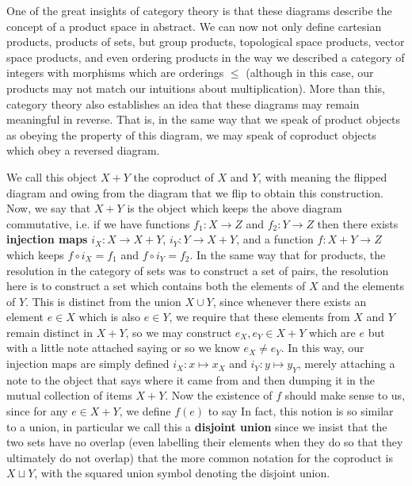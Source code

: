 \documentclass[11pt]{article}
\begin{document}
One of the great insights of category theory is that these diagrams describe the concept of a product space in abstract. We can now not only define cartesian products, products of sets, but group products, topological space products, vector space products, and even ordering products in the way we described a category of integers with morphisms which are orderings $\le$ (although in this case, our products may not match our intuitions about multiplication). More than this, category theory also establishes an idea that these diagrams may remain meaningful in reverse. That is, in the same way that we speak of product objects as obeying the property of this diagram, we may speak of coproduct objects which obey a reversed diagram. 
\begin{detect tikz}\end{detect tikz}
We call this object $X + Y$ the coproduct of $X$ and $Y$, with  meaning the flipped diagram and  owing from the diagram that we flip to obtain this construction. Now, we say that $X + Y$ is the object which keeps the above diagram commutative, i.e. if we have functions $f_1 \colon X \to Z$ and $f_2 \colon Y \to Z$ then there exists \textbf{injection maps} $i_X \colon X \to X + Y$, $i_Y \colon Y \to X + Y$, and a function $f \colon X + Y \to Z$ which keeps $f \circ i_X = f_1$ and $f \circ i_Y = f_2$. In the same way that for products, the resolution in the category of sets was to construct a set of pairs, the resolution here is to construct a set which contains both the elements of $X$ and the elements of $Y$. This is distinct from the union $X \cup Y$, since whenever there exists an element $e \in X$ which is also $e \in Y$, we require that these elements from $X$ and $Y$ remain distinct in $X + Y$, so we may construct $e_X, e_Y \in X + Y$ which are $e$ but with a little note attached saying  or  so we know $e_X \neq e_Y$. In this way, our injection maps are simply defined $i_X \colon x \mapsto x_X$ and $i_Y \colon y \mapsto y_Y$, merely attaching a note to the object that says where it came from and then dumping it in the mutual collection of items $X + Y$. Now the existence of $f$ should make sense to us, since for any $e \in X + Y$, we define $f(e)$ to say  In fact, this notion is so similar to a union, in particular we call this a \textbf{disjoint union} since we insist that the two sets have no overlap (even labelling their elements when they do so that they ultimately do not overlap) that the more common notation for the coproduct is $X \sqcup Y$, with the squared union symbol denoting the disjoint union.
\end{document}
